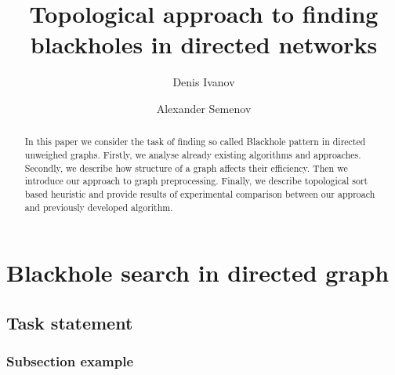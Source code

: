 \documentclass{svproc}
\begin{document}
\mainmatter              %
%
\title{Topological approach to finding blackholes in directed networks}
%
%
\author{Denis Ivanov \and Alexander Semenov}
%
%
%

\maketitle              %

\begin{abstract}
In this paper we consider the task of finding so called Blackhole pattern in directed unweighed graphs.
Firstly, we analyse already existing algorithms and approaches. Secondly, we describe how structure of a graph
affects their efficiency. Then we introduce our approach to graph preprocessing. Finally, we describe topological sort based heuristic
and provide results of experimental comparison between our approach and previously developed algorithm.
\end{abstract}
%
\section{Blackhole search in directed graph}
%

%
\subsection{Task statement}
%

%
\subsubsection{Subsection example}
%
\end{document}
